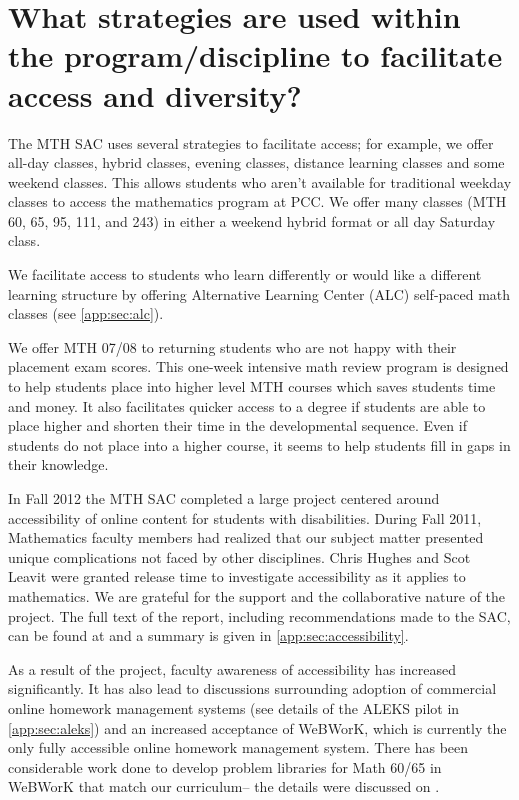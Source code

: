 \section[Strategies to facilitate access and diversity]{What strategies are used within the program/discipline to facilitate access and diversity?}\label{needs:sec:access}
The MTH SAC uses several strategies to facilitate access; for
example, we offer all-day classes, hybrid classes, evening classes, distance learning classes
and some weekend classes. This allows students who aren't available for traditional
weekday classes to access the mathematics program at PCC. We offer many classes (MTH 60, 65, 95, 111, and 243) in either a weekend hybrid format or all day Saturday class.


We facilitate access to students who learn differently or would like a
different learning structure by offering  Alternative Learning Center (ALC)
self-paced math classes (see \vref{app:sec:alc}).

We offer MTH 07/08  to returning students who are not happy with their
placement exam scores. This one-week intensive math review program is designed
to help students place into higher level MTH courses which saves students time
and money. It also facilitates quicker access to a degree if students are able
to place higher and shorten their time in the developmental sequence.  Even if
students do not place into a higher course, it seems to help students fill in
gaps in their knowledge.

In Fall 2012 the MTH SAC completed a large project centered around accessibility of online content
for students with disabilities. During Fall 2011, Mathematics faculty members
had realized that our subject matter presented unique complications not faced by other
disciplines. Chris Hughes and Scot Leavit were granted release time to
investigate accessibility as it applies to mathematics. We are grateful for the
support and the collaborative nature of the project.\label{needs:page:disabilityservices}
The full text of the report, including recommendations made to the SAC, can be found at
\cite{accessibilityproject} and a summary is given in
\vref{app:sec:accessibility}.

As a result of the project, faculty awareness of accessibility has increased
significantly. It has also lead to discussions surrounding adoption of
commercial online homework management systems (see details of the ALEKS pilot
in \vref{app:sec:aleks}) and an increased acceptance of WeBWorK, which is currently
the only fully accessible online homework
management system. There has been considerable work done to develop problem
libraries for Math 60/65 in WeBWorK that match our curriculum-- the details were
discussed on .

